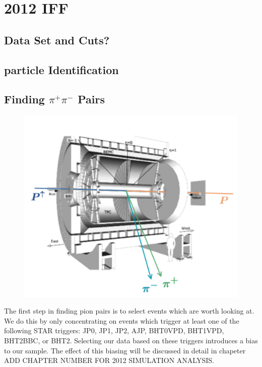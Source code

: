 \documentclass[abstract = on,listof=totoc, bibliography=totoc]{scrreprt}
\begin{document}
\chapter{2012 IFF}

\section{Data Set and Cuts?}
\section{particle Identification}
\section{Finding $\pi^+\pi^-$ Pairs}
\begin{figure}
\begin{center}
\includegraphics[width = .7\textwidth]{starPic6}
\caption[Schematic of Analysis]{}
\label{fig:analSchem}
\end{center}
\end{figure}


The first step in finding pion pairs is to select events which are worth looking at. We do this by only concentrating on events which trigger at least one of the following STAR triggers: JP0, JP1, JP2, AJP, BHT0VPD, BHT1VPD, BHT2BBC, or BHT2. Selecting our data based on these triggers introduces a bias to our sample. The effect of this biasing will be discussed in detail in chapeter ADD CHAPTER NUMBER FOR 2012 SIMULATION ANALYSIS.
\end{document}
